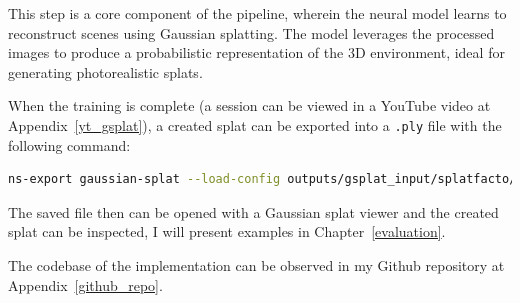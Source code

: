 This step is a core component of the pipeline, wherein the neural model learns to reconstruct scenes using Gaussian splatting. The model leverages the processed images to produce a probabilistic representation of the 3D environment, ideal for generating photorealistic splats.

When the training is complete (a session can be viewed in a YouTube video at Appendix~\ref{yt_gsplat}), a created splat can be exported into a \verb|.ply| file with the following command:
\FloatBarrier
\begin{lstlisting}[language=bash,frame=single,float=!ht]
ns-export gaussian-splat --load-config outputs/gsplat_input/splatfacto/DATE/config.yml --output-dir exports/splat/\end{lstlisting}
\FloatBarrier
The saved file then can be opened with a Gaussian splat viewer and the created splat can be inspected, I will present examples in Chapter~\ref{evaluation}.

The codebase of the implementation can be observed in my Github repository at Appendix~\ref{github_repo}.
